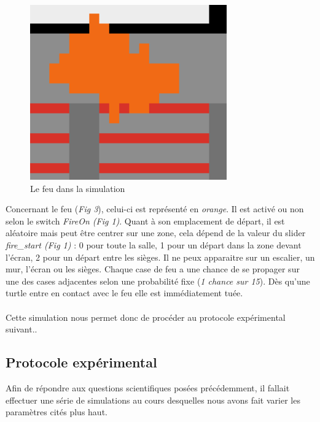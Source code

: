 \documentclass{article}
\begin{document}
\begin{figure}[H]
	\includegraphics[scale=0.5]{feu_im.PNG}
  \centering
	\caption{Le feu dans la simulation}
 	\label{pic: Center}
\end{figure}

Concernant le feu ({\it Fig 3}), celui-ci est représenté en {\it orange}. Il est activé ou non selon le switch {\it FireOn (Fig 1)}. Quant à son emplacement de départ, il est aléatoire mais peut être centrer sur une zone, cela dépend de la valeur du slider {\it fire\_start (Fig 1)} : 0 pour toute la salle, 1 pour un départ dans la zone devant l'écran, 2 pour un départ entre les sièges. Il ne peux apparaitre sur un escalier, un mur, l'écran ou les sièges.
Chaque case de feu a une chance de se propager sur une des cases adjacentes selon une probabilité fixe ({\it 1 chance sur 15}). Dès qu'une turtle entre en contact avec le feu elle est immédiatement tuée.\\\\
Cette simulation nous permet donc de procéder au protocole  expérimental suivant..

\subsection{Protocole expérimental} 

Afin de répondre aux questions scientifiques posées précédemment, il fallait effectuer une série de simulations au cours desquelles nous avons fait varier les paramètres cités plus haut.
\end{document}
